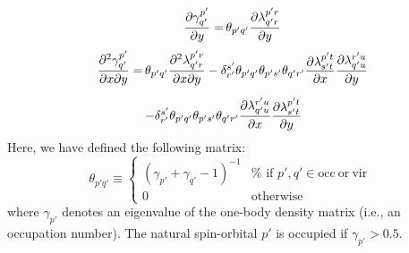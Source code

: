 \begin{subappendices}
\begin{equation}
        \label{eq:one-body-n-rep-gradient}
        \begin{array}{r@{\,}l}
            \dfrac{\partial \gamma^{p'}_{q'}}{\partial{y}}
            =
            &
            \theta_{p'q'}
            \dfrac{\partial \lambda^{p'r}_{q'r}}{\partial{y}}
        \end{array}
    \end{equation}
    \begin{equation}
        \label{eq:one-body-n-rep-hessian}
        \begin{array}{r@{\,}l}
            \dfrac{\partial^2 \gamma^{p'}_{q'}}{%
                \partial{x}
                \partial{y}
            }
            =
            &
            \theta_{p'q'}
            \dfrac{\partial^2 \lambda^{p'r}_{q'r}}{%
                \partial{x}
                \partial{y}
            }
            -
            \delta_{r'}^{s'}
            \theta_{p'q'}
            \theta_{p's'}
            \theta_{q'r'}
            \dfrac{\partial \lambda^{p't}_{s't}}{%
                \partial{x}
            }
            \dfrac{\partial \lambda^{r'u}_{q'u}}{\partial{y}}
            \\[15pt]
            &
            -
            \delta_{r'}^{s'}
            \theta_{p'q'}
            \theta_{p's'}
            \theta_{q'r'}
            \dfrac{\partial \lambda^{r'u}_{q'u}}{\partial{x}}
            \dfrac{\partial \lambda^{p't}_{s't}}{\partial{y}}
        \end{array}
    \end{equation}
    Here, we have defined the following matrix:
    \begin{equation}
        \theta_{p'q'}
        \equiv
        \left\{
            \begin{array}{cc}
                (
                    \gamma_{p'}
                    +
                    \gamma_{q'}
                    -
                    1
                )^{-1}
                &
                \text{%
                    if
                    \(p',q'\in \mathrm{occ \ or \ vir}\)
                }
                \\
                0
                &
                \text{otherwise}
            \end{array}
        \right.
    \end{equation}
    where \(\gamma_{p'}\) denotes an eigenvalue of the one-body density matrix
    (i.e., an occupation number).
    The natural spin-orbital $p'$ is occupied if \(\gamma_{p'} > 0.5\).


\end{subappendices}
